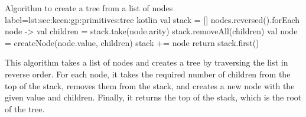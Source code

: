   \begin{code}{Algorithm to create a tree from a list of nodes}{
    label=lst:sec:keen:gp:primitives:tree
  }{kotlin}
    val stack = []
    nodes.reversed().forEach { node ->
        val children = stack.take(node.arity)
        stack.removeAll(children)
        val node = createNode(node.value, children)
        stack += node
    }
    return stack.first()
  \end{code}

  This algorithm takes a list of nodes and creates a tree by traversing the
  list in reverse order. For each node, it takes the required number of
  children from the top of the stack, removes them from the stack, and
  creates a new node with the given value and children. Finally,
  it returns the top of the stack, which is the root of the tree.
